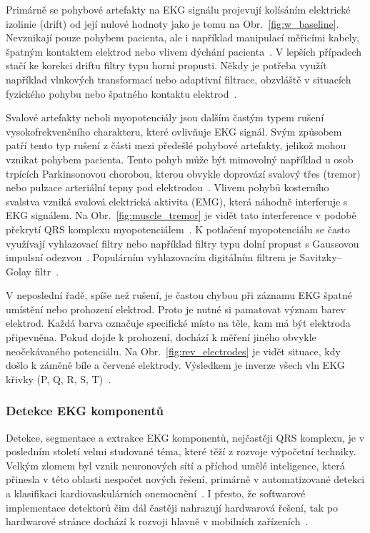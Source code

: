 Primárně se pohybové artefakty na EKG signálu projevují kolísáním elektrické
izolinie (drift) od její nulové hodnoty jako je tomu na
Obr.~\ref{fig:w_baseline}. Nevznikají pouze pohybem pacienta, ale i
například manipulací měřicími kabely, špatným kontaktem elektrod nebo vlivem
dýchání pacienta~\cite{Goldberger2017}. V lepších případech stačí ke korekci
driftu filtry typu horní propusti. Někdy je potřeba využít například
vlnkových transformací nebo adaptivní filtrace, obzvláště v situacích fyzického
pohybu nebo špatného kontaktu elektrod~\cite{Kher2019}.

Svalové artefakty neboli myopotenciály jsou dalším častým typem rušení
vysokofrekvenčního charakteru, které ovlivňuje EKG signál. Svým způsobem patří
tento typ rušení z části mezi předešlé pohybové artefakty, jelikož mohou vznikat
pohybem pacienta. Tento pohyb může být mimovolný například u osob trpících
Parkinsonovou chorobou, kterou obvykle doprovází svalový třes (tremor) nebo
pulzace arteriální tepny pod elektrodou~\cite{Surawicz2008}. Vlivem pohybů
kosterního svalstva vzniká svalová elektrická aktivita (EMG), která náhodně
interferuje s EKG signálem. Na Obr.~\ref{fig:muscle_tremor} je vidět tato
interference v podobě překrytí QRS komplexu
myopotenciálem~\cite{Goldberger2017}. K potlačení myopotenciálu se často
využívají vyhlazovací filtry nebo například filtry typu dolní propust s
Gaussovou impulsní odezvou~\cite{Kher2019}. Populárním vyhlazovacím digitálním
filtrem je Savitzky–Golay filtr~\cite{Schafer2011}.

V neposlední řadě, spíše než rušení, je častou chybou při záznamu EKG špatné
umístění nebo prohození elektrod. Proto je nutné si pamatovat význam barev
elektrod. Každá barva označuje specifické místo na těle, kam má být elektroda
připevněna. Pokud dojde k prohození, dochází k měření jiného obvykle
neočekávaného potenciálu. Na Obr.~\ref{fig:rev_electrodes} je vidět situace, kdy
došlo k záměně bíle a červené elektrody. Výsledkem je inverze všech vln EKG
křivky (P, Q, R, S, T)~\cite{Goldberger2017,Surawicz2008}.

\subsubsection{Detekce EKG komponentů}
\label{section:components_detection_theory}
Detekce, segmentace a extrakce EKG komponentů, nejčastěji QRS komplexu, je v
posledním století velmi studované téma, které těží z rozvoje výpočetní techniky.
Velkým zlomem byl vznik neuronových sítí a příchod umělé inteligence, která
přinesla v této oblasti nespočet nových řešení, primárně v automatizované
detekci a klasifikaci kardiovaskulárních onemocnění~\cite{Kashou2020}. I
přesto, že softwarové implementace detektorů čim dál častěji nahrazují hardwarová
řešení, tak po hardwarové stránce dochází k rozvoji hlavně v mobilních
zařízeních~\cite{Kohler2002}.

